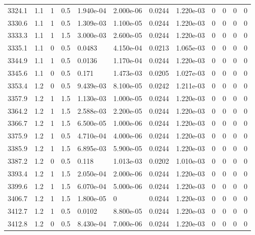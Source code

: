 \documentclass[preview]{standalone}
\begin{document}
{{{{{{{{{{{{{{{{{{{\begin{tabular}{L{1.2cm}C{1.2cm} C{0.3cm}C{0.5cm} C{1.4cm}C{1.4cm} C{1.4cm}C{1.4cm} C{1.6cm}C{1.6cm} C{1.6cm}C{1.6cm}}
  3324.1  &   1.1  & 1     & 0.5 &  1.940e-04  & 2.000e-06  &  0.0244&   1.220e-03& 0 & 0   &  0 & 0  \\ 
  3330.6  &   1.1  & 1     & 0.5 &  1.309e-03  & 1.100e-05  &  0.0244&   1.220e-03& 0 & 0   &  0 & 0  \\ 
  3333.3  &   1.1  & 1     & 1.5 &  3.000e-03  & 2.600e-05  &  0.0244&   1.220e-03& 0 & 0   &  0 & 0  \\ 
  3335.1  &   1.1  & 0     & 0.5 &  0.0483  & 4.150e-04  &  0.0213&   1.065e-03& 0 & 0   &  0 & 0  \\ 
  3344.9  &   1.1  & 1     & 0.5 &  0.0136  & 1.170e-04  &  0.0244&   1.220e-03& 0 & 0   &  0 & 0  \\ 
  3345.6  &   1.1  & 0     & 0.5 &  0.171  & 1.473e-03  &  0.0205&   1.027e-03& 0 & 0   &  0 & 0  \\ 
  3353.4  &   1.2  & 0     & 0.5 &  9.439e-03  & 8.100e-05  &  0.0242&   1.211e-03& 0 & 0   &  0 & 0  \\ 
  3357.9  &   1.2  & 1     & 1.5 &  1.130e-03  & 1.000e-05  &  0.0244&   1.220e-03& 0 & 0   &  0 & 0  \\ 
  3364.2  &   1.2  & 1     & 1.5 &  2.588e-03  & 2.200e-05  &  0.0244&   1.220e-03& 0 & 0   &  0 & 0  \\ 
  3366.7  &   1.2  & 1     & 1.5 &  6.500e-05  & 1.000e-06  &  0.0244&   1.220e-03& 0 & 0   &  0 & 0  \\ 
  3375.9  &   1.2  & 1     & 0.5 &  4.710e-04  & 4.000e-06  &  0.0244&   1.220e-03& 0 & 0   &  0 & 0  \\ 
  3385.9  &   1.2  & 1     & 1.5 &  6.895e-03  & 5.900e-05  &  0.0244&   1.220e-03& 0 & 0   &  0 & 0  \\ 
  3387.2  &   1.2  & 0     & 0.5 &  0.118  & 1.013e-03  &  0.0202&   1.010e-03& 0 & 0   &  0 & 0  \\ 
  3393.4  &   1.2  & 1     & 1.5 &  2.050e-04  & 2.000e-06  &  0.0244&   1.220e-03& 0 & 0   &  0 & 0  \\ 
  3399.6  &   1.2  & 1     & 1.5 &  6.070e-04  & 5.000e-06  &  0.0244&   1.220e-03& 0 & 0   &  0 & 0  \\ 
  3406.7  &   1.2  & 1     & 1.5 &  1.800e-05  & 0  &  0.0244&   1.220e-03& 0 & 0   &  0 & 0  \\ 
  3412.7  &   1.2  & 1     & 0.5 &  0.0102  & 8.800e-05  &  0.0244&   1.220e-03& 0 & 0   &  0 & 0  \\ 
  3412.8  &   1.2  & 0     & 0.5 &  8.430e-04  & 7.000e-06  &  0.0244&   1.220e-03& 0 & 0   &  0 & 0  \\ 

\end{tabular}}}}}}}}}}}}}}}}}}}}
\end{document}
